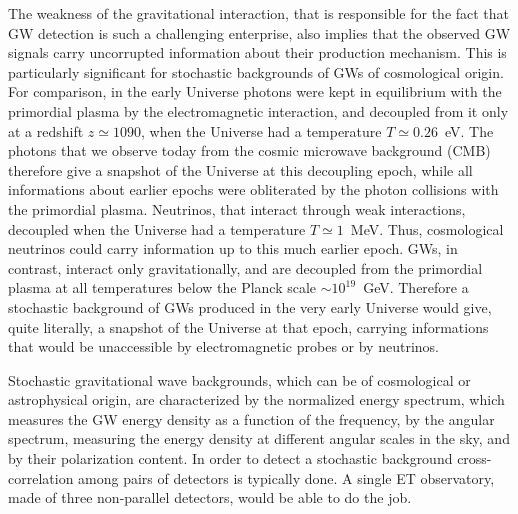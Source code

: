 The weakness of the gravitational interaction, that is responsible for the fact that  GW detection is such a challenging enterprise, 
also implies that the observed GW signals  carry uncorrupted information about their production mechanism. This is particularly significant for stochastic backgrounds of GWs of cosmological origin. For comparison, in the early Universe photons were kept in equilibrium with the primordial plasma by the electromagnetic interaction, and decoupled from it only at a redshift $z\simeq 1090$, when the Universe had a temperature $T\simeq 0.26$~eV. The photons that we observe today from the cosmic microwave background (CMB) therefore give a snapshot of the Universe at this decoupling epoch, while all informations about earlier epochs were obliterated by the photon collisions with the primordial plasma. Neutrinos, that interact through weak interactions, decoupled  when the Universe had a temperature $T\simeq 1$~MeV. Thus, cosmological neutrinos could carry information up to this much earlier epoch. GWs, in contrast, interact only gravitationally, and are decoupled from the primordial plasma at all temperatures below the Planck scale $\sim 10^{19}$~GeV.  Therefore a stochastic background of GWs produced in the very early Universe would give,  quite literally, a snapshot of the Universe at that epoch,
carrying informations that would be unaccessible by electromagnetic probes or by neutrinos.

Stochastic gravitational wave backgrounds, which can be of cosmological or astrophysical origin, are characterized by the normalized energy spectrum, which measures the GW energy density as a function of the frequency, by the angular spectrum, measuring the energy density at different angular scales in the sky, and by their polarization content. In order to detect a stochastic background cross-correlation among pairs of detectors is typically done. A single ET observatory, made of three non-parallel detectors, would be able to do the job.


